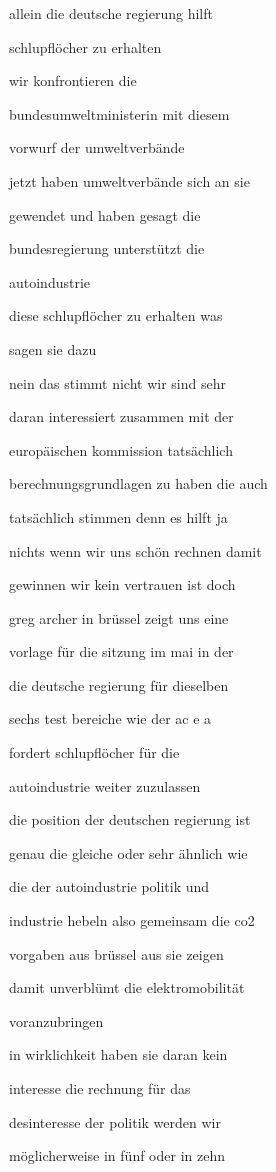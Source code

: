 \documentclass[a4paper, 11pt]{book} %
\begin{document}
allein die deutsche regierung hilft

schlupflöcher zu erhalten

wir konfrontieren die

bundesumweltministerin mit diesem

vorwurf der umweltverbände

jetzt haben umweltverbände sich an sie

gewendet und haben gesagt die

bundesregierung unterstützt die

autoindustrie

diese schlupflöcher zu erhalten was

sagen sie dazu

nein das stimmt nicht wir sind sehr

daran interessiert zusammen mit der

europäischen kommission tatsächlich

berechnungsgrundlagen zu haben die auch

tatsächlich stimmen denn es hilft ja

nichts wenn wir uns schön rechnen damit

gewinnen wir kein vertrauen ist doch

greg archer in brüssel zeigt uns eine

vorlage für die sitzung im mai in der

die deutsche regierung für dieselben

sechs test bereiche wie der ac e a

fordert schlupflöcher für die

autoindustrie weiter zuzulassen

die position der deutschen regierung ist

genau die gleiche oder sehr ähnlich wie

die der autoindustrie politik und

industrie hebeln also gemeinsam die co2

vorgaben aus brüssel aus sie zeigen

damit unverblümt die elektromobilität

voranzubringen

in wirklichkeit haben sie daran kein

interesse die rechnung für das

desinteresse der politik werden wir

möglicherweise in fünf oder in zehn
\end{document}
